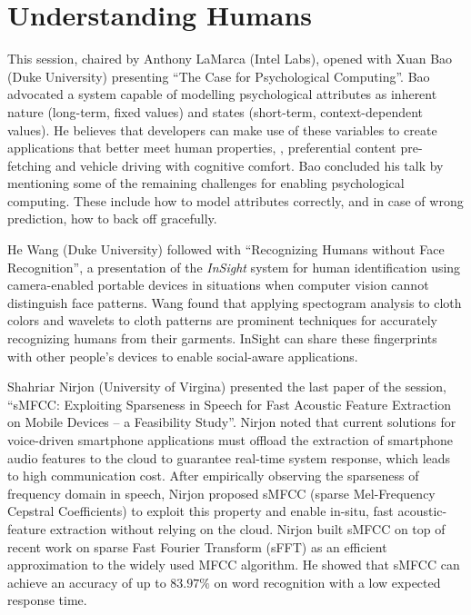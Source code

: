 \section{Understanding Humans}
\label{sec:humans}

This session, chaired by Anthony LaMarca (Intel Labs), opened with Xuan
Bao (Duke University) presenting ``The Case for Psychological
Computing''. Bao advocated a system capable of modelling psychological
attributes as inherent nature (long-term, fixed values) and states
(short-term, context-dependent values). He believes that developers can
make use of these variables to create applications that better meet
human properties, \eg, preferential content pre-fetching and vehicle
driving with cognitive comfort. Bao concluded his talk by mentioning
some of the remaining challenges for enabling psychological computing.
These include how to model attributes correctly, and in case of wrong
prediction, how to back off gracefully.

He Wang (Duke University) followed with ``Recognizing Humans without Face
Recognition'', a presentation of the \emph{InSight} system for human
identification using camera-enabled portable devices in situations when
computer vision cannot distinguish face patterns. Wang found that
applying spectogram analysis to cloth colors and wavelets to cloth
patterns are prominent techniques for accurately recognizing humans from
their garments. InSight can share these fingerprints with other people's
devices to enable social-aware applications.

Shahriar Nirjon (University of Virgina) presented the last paper of
the session, ``sMFCC: Exploiting Sparseness in Speech for Fast Acoustic
Feature Extraction on Mobile Devices -- a Feasibility Study''. Nirjon
noted that current solutions for voice-driven smartphone applications
must offload the extraction of smartphone audio features to the cloud to
guarantee real-time system response, which leads to high communication
cost. After empirically observing the sparseness of frequency domain in
speech, Nirjon proposed sMFCC (sparse Mel-Frequency Cepstral
Coefficients) to exploit this property and enable in-situ, fast
acoustic-feature extraction without relying on the cloud. Nirjon built
sMFCC on top of recent work on sparse Fast Fourier Transform (sFFT) as
an efficient approximation to the widely used MFCC algorithm. He showed
that sMFCC can achieve an accuracy of up to $83.97\%$ on word
recognition with a low expected response time.
